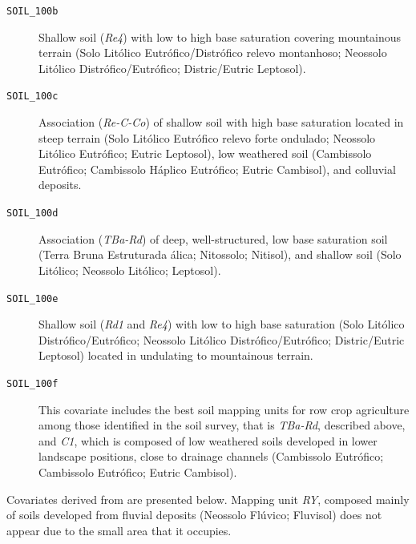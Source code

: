 \begin{description}
 \item[\texttt{SOIL\_100b}] Shallow soil (\textit{Re4}) with low to high base saturation covering mountainous 
 terrain (Solo Litólico Eutrófico/Distrófico relevo montanhoso; Neossolo Litólico Distrófico/Eutrófico;
 Distric/Eutric Leptosol).
  
 \item[\texttt{SOIL\_100c}] Association (\textit{Re-C-Co}) of shallow soil with high base saturation located in
steep terrain (Solo Litólico Eutrófico relevo forte ondulado; Neossolo Litólico Eutrófico; Eutric
 Leptosol), low weathered soil (Cambissolo Eutrófico; Cambissolo Háplico Eutrófico; Eutric Cambisol), and
 colluvial deposits.
  
 \item[\texttt{SOIL\_100d}] Association (\textit{TBa-Rd}) of deep, well-structured, low base saturation soil 
(Terra
 Bruna Estruturada álica; Nitossolo; Nitisol), and shallow soil (Solo Litólico; Neossolo Litólico; Leptosol).
  
 \item[\texttt{SOIL\_100e}] Shallow soil (\textit{Rd1} and \textit{Re4}) with low to high base
 saturation (Solo Litólico Distrófico/Eutrófico; Neossolo Litólico Distrófico/Eutrófico; Distric/Eutric
 Leptosol) located in undulating to mountainous terrain.
  
 \item[\texttt{SOIL\_100f}] This covariate includes the best soil mapping units for row crop agriculture among 
those 
 identified in the soil survey, that is \textit{TBa-Rd}, described above, and \textit{C1}, which is composed
 of low weathered soils developed in lower landscape positions, close to drainage channels (Cambissolo
 Eutrófico; Cambissolo Eutrófico; Eutric Cambisol).
\end{description}

Covariates derived from \soilNew{} are presented below. Mapping unit \textit{RY}, composed mainly of soils 
developed 
from fluvial deposits (Neossolo Flúvico; Fluvisol) does not appear due to the small area that it occupies.


